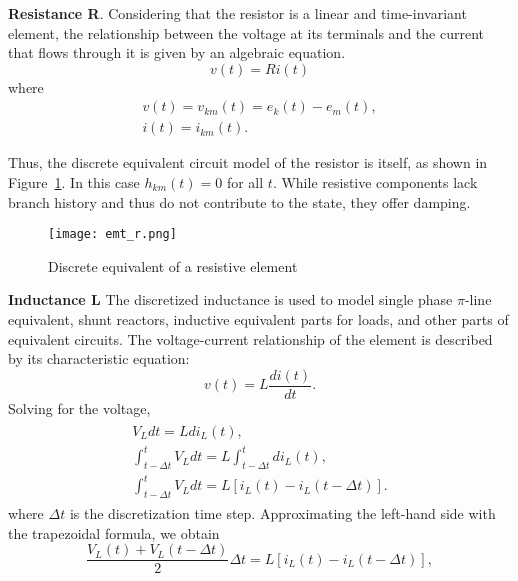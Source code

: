 \textbf{Resistance R}. Considering that the resistor is a linear and time-invariant element, the relationship between the voltage at its terminals and the current that flows through it is given by an algebraic equation.
\begin{equation}
    v(t)=Ri(t)
\end{equation}
where
\begin{equation}
    \begin{array}{c}
v(t)=v_{k m}(t)=e_{k}(t)-e_{m}(t), \\
i(t)=i_{k m}(t).
\end{array}
\end{equation}

Thus, the discrete equivalent circuit model of the resistor is itself, as shown in Figure~\cref{fig:emt_r}. In this case $h_{km}(t) = 0$ for all $t$. While resistive components lack branch history and thus do not contribute to the state, they offer damping.

\begin{figure}[htbp]
    \centering
    \texttt{[image: emt\_r.png]}
    \caption{Discrete equivalent of a resistive element}
    \label{fig:emt_r}
\end{figure}

\textbf{Inductance L}
The discretized inductance is used to model single phase $\pi$-line equivalent, shunt reactors, inductive equivalent parts for loads, and other parts of equivalent circuits. The voltage-current relationship of the element is described by its characteristic equation:
\begin{equation}
    v(t)=L \frac{d i(t)}{d t} .
\end{equation}
Solving for the voltage,
\begin{equation}
\begin{aligned}
    \begin{array}{c}
\displaystyle V_{L} d t=L d i_{L}(t), \\[1em]
\displaystyle \int_{t-\Delta t}^{t} V_{L} d t=L \int_{t-\Delta t}^{t} d i_{L}(t), \\[1em]
\displaystyle \int_{t-\Delta t}^{t} V_{L} d t=L\left[i_{L}(t)-i_{L}(t-\Delta t)\right].
\end{array}
\end{aligned}
\end{equation}
where $\Delta t$ is the discretization time step. Approximating the left-hand side with the trapezoidal formula, we obtain
\begin{equation}
    \frac{V_{L}(t)+V_{L}(t-\Delta t)}{2} \Delta t=L\left[i_{L}(t)-i_{L}(t-\Delta t)\right],
\end{equation}


